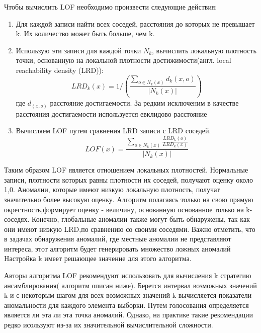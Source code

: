 Чтобы вычислить LOF необходимо произвести следующие действия:
\begin{enumerate}
\item Для каждой записи найти всех соседей, расстояния до которых не превышает k. Их количество может быть больше, чем k.
\item Использую эти записи для каждой точки $N_k$, вычислить локальную плотность точки, основанную на локальной плотности достижимости(англ. local reachability density (LRD)):
\begin{equation}
LRD_k(x) = 1/(\frac{\sum_{o \in N_k(x)}d_k (x,o)}{|N_k (x)|})
\end{equation}
где $d_(x,o)$ расстояние достигаемости. За редким исключеним в качестве расстояния достигаемости используется евклидово расстояние \cite{Book12}
\item Вычисляем LOF путем сравнения LRD записи с LRD соседей.
\begin{equation}
LOF(x) = \frac{\sum_{o \in N_k(x)}\frac{LRD_k (o)}{LRD_k (x)}}{|N_k (x)|}
\end{equation}
\end{enumerate}
Таким образом LOF является отношением локальных плотностей.  Нормальные записи, плотности которых равны плотности их соседей, получают оценку около 1,0. Аномалии, которые имеют низкую локальную плотность, получат значительно более высокую оценку. Алгоритм полагаясь только на свою прямую окрестность,формирует  оценку - величину, основанную основанное только на k-соседях. Конечно, глобальные аномалии также могут быть обнаружены, так как они  имеют низкую LRD,по сравнению со своими соседями. Важно отметить, что в задачах обнаружения аномалий, где местные аномалии не представляют интереса, этот алгоритм будет генерировать множество ложных аномалий Hастройка k имеет решающее значение для этого алгоритма.

Авторы алгоритма LOF рекомендуют использовать для вычисления k стратегию ансамблирования( алгоритм описан ниже). Берется интервал возможных значений k и с некоторым шагом для всех возможных значений k вычисляется показатели аномальности для каждого элемента выборки. Путем голосования определяется является ли эта ли эта точка аномалий. Однако, на практике такие рекомендации редко исользуют из-за их значительной вычислительной сложности.
